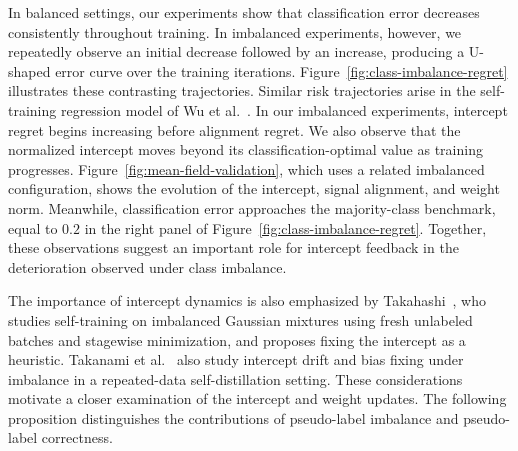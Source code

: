 In balanced settings, our experiments show that classification error decreases consistently throughout training.
In imbalanced experiments, however, we repeatedly observe an
initial decrease followed by an increase, producing a U-shaped
error curve over the training iterations.
Figure~\ref{fig:class-imbalance-regret} illustrates these
contrasting trajectories.
Similar risk trajectories arise in the self-training regression
model of Wu et al.~\cite{wu2026selftraininghelpshurtsdenoising}.
In our imbalanced experiments, intercept regret begins
increasing before alignment regret.
We also observe that the normalized intercept moves beyond
its classification-optimal value as training progresses.
Figure~\ref{fig:mean-field-validation}, which uses a related
imbalanced configuration, shows the evolution of the
intercept, signal alignment, and weight norm.
Meanwhile, classification error approaches the majority-class
benchmark, equal to $0.2$ in the right panel of
Figure~\ref{fig:class-imbalance-regret}.
Together, these observations suggest an important role for
intercept feedback in the deterioration observed under
class imbalance.

The importance of intercept dynamics is also emphasized by
Takahashi~\cite{takahashi2026role}, who studies self-training
on imbalanced Gaussian mixtures using fresh unlabeled batches
and stagewise minimization, and proposes fixing the intercept
as a heuristic.
Takanami et al.~\cite{takanami2025effect} also study intercept
drift and bias fixing under imbalance in a repeated-data
self-distillation setting. 
These considerations motivate a closer examination of the
intercept and weight updates.
The following proposition distinguishes the contributions
of pseudo-label imbalance and pseudo-label correctness.

